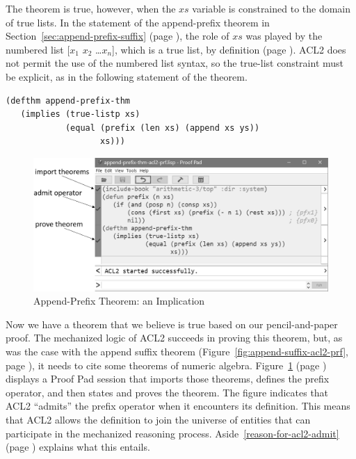 The theorem is true, however, when the $xs$ variable is
constrained to the domain of true lists.
In the statement of the append-prefix theorem in
Section~\ref{sec:append-prefix-suffix} (page \pageref{append-prefix-thm-predicate}),
the role of $xs$ was played by the numbered list
[$x_1$ $x_2$ \dots $x_n$], which is a true list, by definition
(page \pageref{numbered-list-interpretation}).
ACL2 does not permit the use of the numbered list syntax,
so the true-list constraint must be explicit,
as in the following statement of the theorem.

\begin{Verbatim}
(defthm append-prefix-thm
   (implies (true-listp xs)
            (equal (prefix (len xs) (append xs ys))
                   xs)))
\end{Verbatim}

\begin{figure}
\begin{center}
\includegraphics[scale=0.43]{images/append-prefix-thm-acl2-prf-bw.png}
\end{center}
\caption{Append-Prefix Theorem: an Implication}
\label{fig:append-prefix-acl2-prf}
\end{figure}

Now we have a theorem that we believe is true
based on our pencil-and-paper proof.
The mechanized logic of ACL2
succeeds in proving this theorem, but, as was the case with
the append suffix theorem
(Figure~\ref{fig:append-suffix-acl2-prf}, page \pageref{fig:append-suffix-acl2-prf}),
it needs to cite some theorems of numeric algebra.
Figure~\ref{fig:append-prefix-acl2-prf} (page \pageref{fig:append-prefix-acl2-prf})
displays a Proof Pad session that imports those theorems,
defines the prefix operator, and then states and proves the theorem.
The figure indicates that ACL2
``admits'' the prefix operator when it encounters its definition.
This means that ACL2 allows the definition to join
the universe of entities that can participate in
the mechanized reasoning process.
Aside~\ref{reason-for-acl2-admit} (page \pageref{reason-for-acl2-admit})
explains what this entails.

